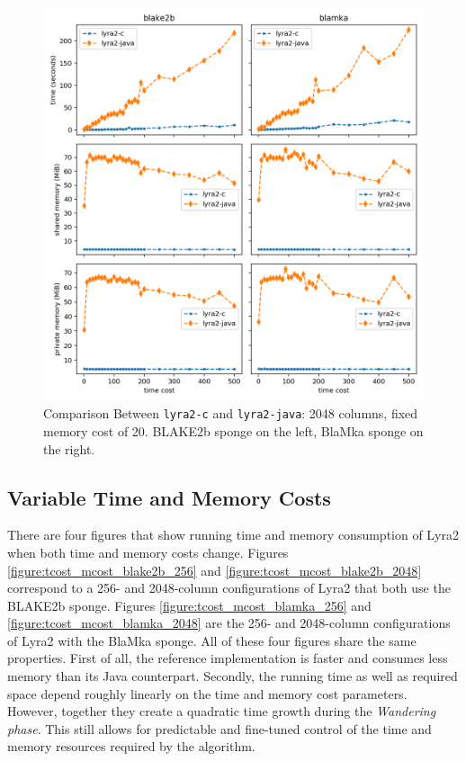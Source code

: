 \begin{figure}[H]
    \centering
    \includegraphics[width=\linewidth,keepaspectratio]{figures/tcost_2048}
    \caption{Comparison Between \texttt{lyra2-c} and \texttt{lyra2-java}: 2048 columns, fixed memory cost of 20. BLAKE2b sponge on the left, BlaMka sponge on the right.}
    \label{figure:tcost_2048}
\end{figure}

\subsection{Variable Time and Memory Costs}
\label{sec:no-fixed-costs}

There are four figures that show running time and memory consumption of Lyra2 when both time and memory costs change. Figures \ref{figure:tcost_mcost_blake2b_256} and \ref{figure:tcost_mcost_blake2b_2048} correspond to a 256- and 2048-column configurations of Lyra2 that both use the BLAKE2b sponge. Figures \ref{figure:tcost_mcost_blamka_256} and \ref{figure:tcost_mcost_blamka_2048} are the 256- and 2048-column configurations of Lyra2 with the BlaMka sponge. All of these four figures share the same properties. First of all, the reference implementation is faster and consumes less memory than its Java counterpart. Secondly, the running time as well as required space depend roughly linearly on the time and memory cost parameters. However, together they create a quadratic time growth during the \emph{Wandering phase}. This still allows for predictable and fine-tuned control of the time and memory resources required by the algorithm.

